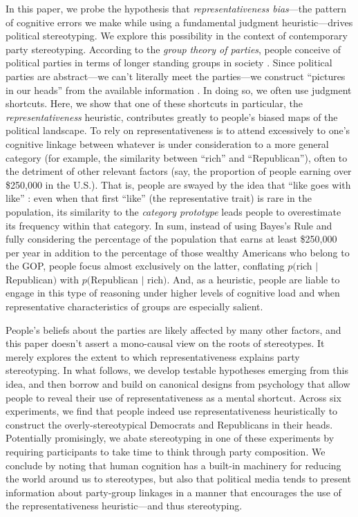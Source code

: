 \documentclass[12pt, letterpaper]{article}
\begin{document}
In this paper, we probe the hypothesis that \emph{representativeness bias}---the pattern of cognitive errors we make while using a fundamental judgment heuristic---drives political stereotyping. We explore this possibility in the context of contemporary party stereotyping. According to the \emph{group theory of parties}, people conceive of political parties in terms of longer standing groups in society \citep{ahler2018forum, busby2016what,GreenPalmquistSchickler2002,mason2018uncivil}. Since political parties are abstract---we can't literally meet the parties---we construct ``pictures in our heads'' from the available information \citep{Lippmann1922}. In doing so, we often use judgment shortcuts. Here, we show that one of these shortcuts in particular, the \emph{representativeness} heuristic, contributes greatly to people's biased maps of the political landscape. To rely on representativeness is to attend excessively to one's cognitive linkage between whatever is under consideration to a more general category (for example, the similarity between ``rich'' and ``Republican''), often to the detriment of other relevant factors (say, the proportion of people earning over \$250,000 in the U.S.). That is, people are swayed by the idea that ``like goes with like'' \citep{gilovich1981like}: even when that first ``like'' (the representative trait) is rare in the population, its similarity to the \emph{category prototype} leads people to overestimate its frequency within that category. In sum, instead of using Bayes's Rule and fully considering the percentage of the population that earns at least \$250,000 per year in addition to the percentage of those wealthy Americans who belong to the GOP, people focus almost exclusively on the latter, conflating $p($rich $|$ Republican$)$ with $p($Republican $|$ rich$)$. And, as a heuristic, people are liable to engage in this type of reasoning under higher levels of cognitive load and when representative characteristics of groups are especially salient.

People's beliefs about the parties are likely affected by many other factors, and this paper doesn't assert a mono-causal view on the roots of stereotypes. It merely explores the extent to which representativeness explains party stereotyping. In what follows, we develop testable hypotheses emerging from this idea, and then borrow and build on canonical designs from psychology that allow people to reveal their use of representativeness as a mental shortcut. Across six experiments, we find that people indeed use representativeness heuristically to construct the overly-stereotypical Democrats and Republicans in their heads. Potentially promisingly, we abate stereotyping in one of these experiments by requiring participants to take time to think through party composition. We conclude by noting that human cognition has a built-in machinery for reducing the world around us to stereotypes, but also that political media tends to present information about party-group linkages in a manner that encourages the use of the representativeness heuristic---and thus stereotyping.
\end{document}
